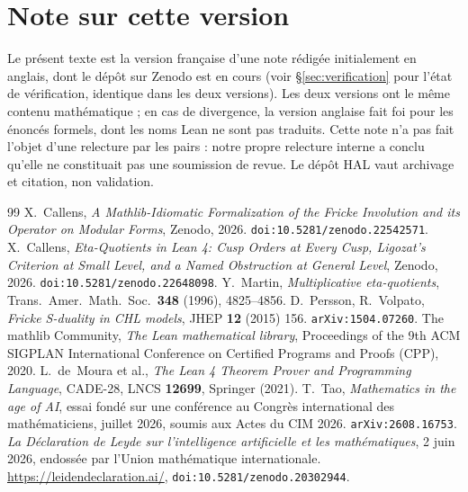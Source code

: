 \documentclass[11pt, a4paper]{article}
\theoremstyle{remark}
\begin{document}
\section*{Note sur cette version}

Le présent texte est la version française d'une note rédigée initialement en anglais, dont le
dépôt sur Zenodo est en cours (voir \S\ref{sec:verification} pour l'état de vérification, identique
dans les deux versions). Les deux versions ont le même contenu mathématique ; en cas de
divergence, la version anglaise fait foi pour les énoncés formels, dont les noms Lean ne sont pas
traduits. Cette note n'a pas fait l'objet d'une relecture par les pairs : notre propre relecture
interne a conclu qu'elle ne constituait pas une soumission de revue. Le dépôt HAL vaut archivage
et citation, non validation.

\begin{thebibliography}{99}
 X.~Callens, \textit{A Mathlib-Idiomatic Formalization of the Fricke Involution
and its Operator on Modular Forms}, Zenodo, 2026. \texttt{doi:10.5281/zenodo.22542571}.
 X.~Callens, \textit{Eta-Quotients in Lean 4: Cusp Orders at Every Cusp,
Ligozat's Criterion at Small Level, and a Named Obstruction at General Level}, Zenodo, 2026.
\texttt{doi:10.5281/zenodo.22648098}.
 Y.~Martin, \textit{Multiplicative eta-quotients}, Trans.\ Amer.\ Math.\ Soc.\ \textbf{348} (1996), 4825--4856.
 D.~Persson, R.~Volpato, \textit{Fricke S-duality in CHL models}, JHEP \textbf{12} (2015) 156. \texttt{arXiv:1504.07260}.
 The mathlib Community, \textit{The Lean mathematical library}, Proceedings of the 9th ACM SIGPLAN International Conference on Certified Programs and Proofs (CPP), 2020.
 L.~de~Moura et al., \textit{The Lean 4 Theorem Prover and Programming Language}, CADE-28, LNCS \textbf{12699}, Springer (2021).
 T.~Tao, \textit{Mathematics in the age of AI}, essai fondé sur une conférence
au Congrès international des mathématiciens, juillet 2026, soumis aux Actes du CIM 2026.
\texttt{arXiv:2608.16753}.
 \textit{La Déclaration de Leyde sur l'intelligence artificielle et les
mathématiques}, 2 juin 2026, endossée par l'Union mathématique internationale.
\url{https://leidendeclaration.ai/}, \texttt{doi:10.5281/zenodo.20302944}.
\end{thebibliography}
\end{document}
